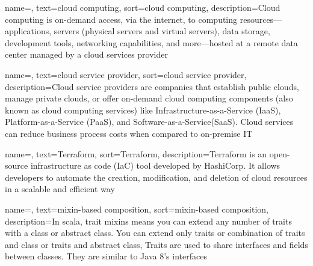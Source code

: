 
\renewcommand{\acronymname}{Acronyms and abbreviations}




%

{
    name=,
    text=cloud computing,
    sort=cloud computing,
    description={Cloud computing is on-demand access, via the internet, to computing resources—applications, servers (physical servers and virtual servers), data storage, development tools, networking capabilities, and more—hosted at a remote data center managed by a cloud services provider}
}

{
    name=,
    text=cloud service provider,
    sort=cloud service provider,
    description={Cloud service providers are companies that establish public clouds, manage private clouds, or offer on-demand cloud computing components (also known as cloud computing services) like Infrastructure-as-a-Service (IaaS), Platform-as-a-Service (PaaS), and Software-as-a-Service(SaaS). Cloud services can reduce business process costs when compared to on-premise IT}
}

{
    name=,
    text=Terraform,
    sort=Terraform,
    description={Terraform is an open-source infrastructure as code (IaC) tool developed by HashiCorp. It allows developers to automate the creation, modification, and deletion of cloud resources in a scalable and efficient way }
}

{
    name=,
    text=mixin-based composition,
    sort=mixin-based composition,
    description={In scala, trait mixins means you can extend any number of traits with a class or abstract class. You can extend only traits or combination of traits and class or traits and abstract class,
    Traits are used to share interfaces and fields between classes. They are similar to Java 8’s interfaces }
}

